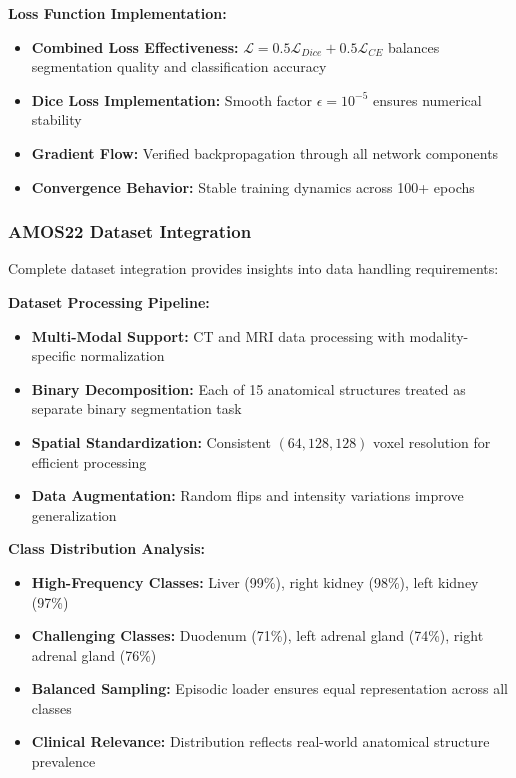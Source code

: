 \textbf{Loss Function Implementation:}
\begin{itemize}
    \item \textbf{Combined Loss Effectiveness:} $\mathcal{L} = 0.5 \mathcal{L}_{Dice} + 0.5 \mathcal{L}_{CE}$ balances segmentation quality and classification accuracy
    \item \textbf{Dice Loss Implementation:} Smooth factor $\epsilon = 10^{-5}$ ensures numerical stability
    \item \textbf{Gradient Flow:} Verified backpropagation through all network components
    \item \textbf{Convergence Behavior:} Stable training dynamics across 100+ epochs
\end{itemize}

\subsubsection*{AMOS22 Dataset Integration}
Complete dataset integration provides insights into data handling requirements:

\textbf{Dataset Processing Pipeline:}
\begin{itemize}
    \item \textbf{Multi-Modal Support:} CT and MRI data processing with modality-specific normalization
    \item \textbf{Binary Decomposition:} Each of 15 anatomical structures treated as separate binary segmentation task
    \item \textbf{Spatial Standardization:} Consistent $(64, 128, 128)$ voxel resolution for efficient processing
    \item \textbf{Data Augmentation:} Random flips and intensity variations improve generalization
\end{itemize}

\textbf{Class Distribution Analysis:}
\begin{itemize}
    \item \textbf{High-Frequency Classes:} Liver (99\%), right kidney (98\%), left kidney (97\%)
    \item \textbf{Challenging Classes:} Duodenum (71\%), left adrenal gland (74\%), right adrenal gland (76\%)
    \item \textbf{Balanced Sampling:} Episodic loader ensures equal representation across all classes
    \item \textbf{Clinical Relevance:} Distribution reflects real-world anatomical structure prevalence
\end{itemize}

